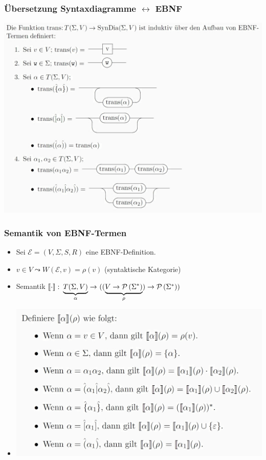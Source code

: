 \documentclass{beamer}
\newcommand{\sem}[1]{\left\llbracket #1 \right\rrbracket}
\begin{document}
\begin{frame} \frametitle{Übersetzung Syntaxdiagramme $\leftrightarrow$ EBNF}
	\centering
	\includegraphics[width=.9\textwidth]{tut04_trans.jpg}
\end{frame}

\begin{frame} \frametitle{Semantik von EBNF-Termen}
	\begin{itemize}
		\item Sei $\mathcal{E} = (V,\Sigma,S,R)$ eine EBNF-Definition.
		\item $v \in V \leadsto W(\mathcal{E},v) = \rho(v)$ (syntaktische Kategorie)
		\item Semantik $\abb{\sem{\cdot}}{\underbrace{T(\Sigma, V)}_{\alpha}}{((\underbrace{V \to \pows{\Sigma^\ast}}_{\rho}) \to \pows{\Sigma^\ast})}$
		\item[] \includegraphics[width=.9\textwidth]{tut04_semantik.jpg}
	\end{itemize}	
\end{frame}
\end{document}
